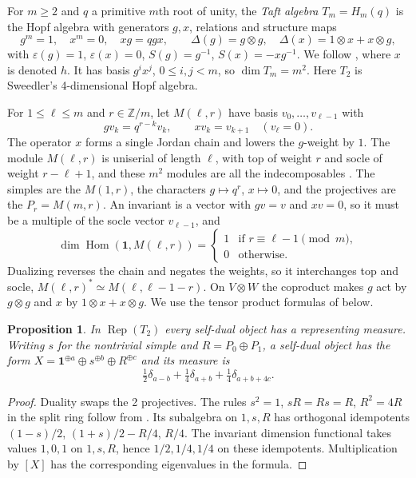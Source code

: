 \documentclass[11pt,reqno]{amsart}
\newtheorem{proposition}[theorem]{Proposition}
\theoremstyle{definition}
\newcommand{\Hom}{\operatorname{Hom}}
\newcommand{\one}{\mathbf 1}
\newcommand{\ZZ}{\mathbb Z}
\newcommand{\Rep}{\operatorname{Rep}}
\begin{document}
For $m\geq2$ and $q$ a primitive $m$th root of unity, the \emph{Taft algebra} $T_m=H_m(q)$ is the Hopf algebra with generators $g,x$, relations and structure maps
\[
  g^m=1,\quad x^m=0,\quad xg=qgx,\qquad
  \Delta(g)=g\otimes g,\quad \Delta(x)=1\otimes x+x\otimes g,
\]
with $\varepsilon(g)=1$, $\varepsilon(x)=0$, $S(g)=g^{-1}$, $S(x)=-xg^{-1}$. We follow \cite[\S1]{CVZ}, where $x$ is denoted $h$. It has basis $g^ix^j$, $0\leq i,j<m$, so $\dim T_m=m^2$. Here $T_2$ is Sweedler's 4-dimensional Hopf algebra.

For $1\leq\ell\leq m$ and $r\in\ZZ/m$, let $M(\ell,r)$ have basis $v_0,\ldots,v_{\ell-1}$ with
\[
 gv_k=q^{r-k}v_k,\qquad xv_k=v_{k+1}\quad(v_\ell=0).
\]
The operator $x$ forms a single Jordan chain and lowers the $g$-weight by $1$. The module $M(\ell,r)$ is uniserial of length $\ell$, with top of weight $r$ and socle of weight $r-\ell+1$, and these $m^2$ modules are all the indecomposables \cite[Lemmas~2.2--2.3, Corollary~2.4 and Theorem~2.5]{CVZ}. The simples are the $M(1,r)$, the characters $g\mapsto q^r$, $x\mapsto0$, and the projectives are the $P_r=M(m,r)$. An invariant is a vector with $gv=v$ and $xv=0$, so it must be a multiple of the socle vector $v_{\ell-1}$, and
\[
 \dim\Hom(\one,M(\ell,r))=\begin{cases}1&\text{if }r\equiv\ell-1\pmod m,\\0&\text{otherwise}.\end{cases}
\]
Dualizing reverses the chain and negates the weights, so it interchanges top and socle, $M(\ell,r)^*\simeq M(\ell,\ell-1-r)$. On $V\otimes W$ the coproduct makes $g$ act by $g\otimes g$ and $x$ by $1\otimes x+x\otimes g$. We use the tensor product formulas of \cite{CVZ} below.

\begin{proposition}\label{prop:sweedler}
In $\Rep(T_2)$ every self-dual object has a representing measure.
Writing $s$ for the nontrivial simple and $R=P_0\oplus P_1$, a
self-dual object has the form $X=\one^{\oplus a}\oplus s^{\oplus b}
\oplus R^{\oplus c}$ and its measure is
\[
 \tfrac12\delta_{a-b}+\tfrac14\delta_{a+b}
                 +\tfrac14\delta_{a+b+4c}.
\]
\end{proposition}
\begin{proof}
Duality swaps the 2 projectives. The rules
$s^2=1$, $sR=Rs=R$, $R^2=4R$ in the split ring follow from
\cite[Lemma~3.1 and Proposition~3.2]{CVZ}. Its subalgebra on $1,s,R$
has orthogonal idempotents $(1-s)/2$, $(1+s)/2-R/4$, $R/4$.
The invariant dimension functional takes values $1,0,1$ on $1,s,R$,
hence $1/2,1/4,1/4$ on these idempotents. Multiplication by $[X]$
has the corresponding eigenvalues in the formula.
\end{proof}
\end{document}
